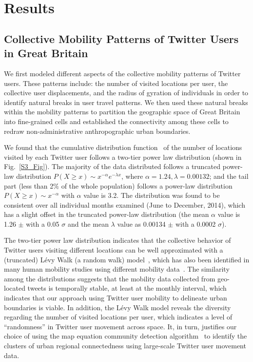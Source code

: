 \documentclass[]{tGIS2e}
\begin{document}
\section{Results}
\subsection{Collective Mobility Patterns of Twitter Users in Great Britain}
We first modeled different aspects of the collective mobility patterns of Twitter users.
These patterns include: the number of visited locations per user,  the collective user displacements, and the radius of gyration of individuals in order to identify natural breaks in user travel patterns.
We then used these natural breaks within the mobility patterns to partition the geographic space of Great Britain into fine-grained cells and established the connectivity among these cells to redraw non-administrative anthropographic urban boundaries. 

We found that the cumulative distribution function~\citep{clauset2009} of the number of locations visited by each Twitter user follows a two-tier power law distribution (shown in Fig.~\ref{S3_Fig}). 
The majority of the data distributed follows a truncated power-law distribution $P(X\geq x)\sim x^{-\alpha}e^{-\lambda x}$, where $\alpha = 1.24, \lambda =0.00132$; and the tail part (less than 2$\%$ of the whole population) follows a power-law distribution  $P(X \geq x)\sim x^{-\alpha}$ with $\alpha$ value is 3.2.
The distribution was found to be consistent over all individual months examined (June to December, 2014), which has a slight offset in the truncated power-law distribution (the mean $\alpha$ value is 1.26 $ \pm$ with a 0.05 $\sigma$ and the mean $\lambda$ value as 0.00134 $ \pm$  with a 0.0002 $\sigma$). 

The two-tier power law distribution indicates that the collective behavior of Twitter users visiting different locations can be well approximated with a (truncated) L\'{e}vy Walk (a random walk) model~\citep{rhee2011,reynolds2012}, which has also been identified in many human mobility studies using different mobility data~\citep{zhao2015}.
The similarity among the distributions suggests that the mobility data collected from geo-located tweets is temporally stable, at least at the monthly interval, which indicates that our approach using Twitter user mobility to delineate urban boundaries is viable.  
In addition, the L\'{e}vy Walk model reveals the diversity regarding the number of visited locations per user, which indicates a level of ``randomness'' in Twitter user movement across space. 
It, in turn, justifies our choice of using the map equation community detection algorithm~\citep{rosvall2008} to identify the clusters of urban regional connectedness using large-scale Twitter user movement data.
\end{document}

